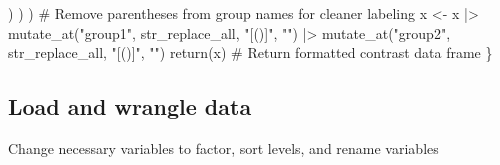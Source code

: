 \documentclass[
  bookmarksnumbered]{article}
\newenvironment{Shaded}{\begin{snugshade}}{\end{snugshade}}
\newcommand{\CommentTok}[1]{\textcolor[rgb]{0.50,0.62,0.50}{#1}}
\newcommand{\FunctionTok}[1]{\textcolor[rgb]{0.94,0.94,0.56}{#1}}
\newcommand{\NormalTok}[1]{\textcolor[rgb]{0.80,0.80,0.80}{#1}}
\newcommand{\OtherTok}[1]{\textcolor[rgb]{0.94,0.94,0.56}{#1}}
\newcommand{\SpecialCharTok}[1]{\textcolor[rgb]{0.86,0.64,0.64}{#1}}
\newcommand{\StringTok}[1]{\textcolor[rgb]{0.80,0.58,0.58}{#1}}
\begin{document}
\begin{Shaded}
\begin{Highlighting}[]
\NormalTok{      )}
\NormalTok{    )}
\NormalTok{  )}
  \CommentTok{\# Remove parentheses from group names for cleaner labeling}
\NormalTok{  x }\OtherTok{\textless{}{-}}\NormalTok{ x }\SpecialCharTok{|\textgreater{}}
    \FunctionTok{mutate\_at}\NormalTok{(}\StringTok{"group1"}\NormalTok{, str\_replace\_all, }\StringTok{"[()]"}\NormalTok{, }\StringTok{""}\NormalTok{) }\SpecialCharTok{|\textgreater{}}
    \FunctionTok{mutate\_at}\NormalTok{(}\StringTok{"group2"}\NormalTok{, str\_replace\_all, }\StringTok{"[()]"}\NormalTok{, }\StringTok{""}\NormalTok{)}
  \FunctionTok{return}\NormalTok{(x) }\CommentTok{\# Return formatted contrast data frame}
\NormalTok{\}}
\end{Highlighting}
\end{Shaded}

\subsection{Load and wrangle data}\label{load-and-wrangle-data}

Change necessary variables to factor, sort levels, and rename variables
\end{document}
